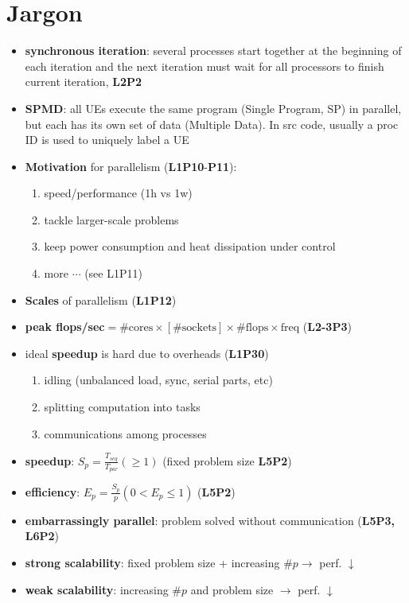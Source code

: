 \section*{Jargon}
\begin{itemize}
\item \textbf{synchronous iteration}: several processes start together at the beginning of each iteration and the next iteration must wait for all processors to finish current iteration, \textbf{L2P2}
\item \textbf{SPMD}: all UEs execute the same program (Single Program, SP) in parallel, but each has its own set of data (Multiple Data). In src code, usually a proc ID is used to uniquely label a UE
\item \textbf{Motivation} for parallelism (\textbf{L1P10}-\textbf{P11}):
  \begin{enumerate}
  \item speed/performance (1h vs 1w)
  \item tackle larger-scale problems
  \item keep power consumption and heat dissipation under control
  \item more $\cdots$ (see L1P11)
  \end{enumerate}
\item \textbf{Scales} of parallelism (\textbf{L1P12})
\item \textbf{peak flops/sec}$ = \# \text{cores} \times [\# \text{sockets}] \times \# \text{flops} \times \text{freq}$ (\textbf{L2-3P3})
\item ideal \textbf{speedup} is hard due to overheads (\textbf{L1P30})
  \begin{enumerate}
  \item idling (unbalanced load, sync, serial parts, etc)
  \item splitting computation into tasks
  \item communications among processes
  \end{enumerate}
\item \textbf{speedup}: $S_p = \frac{T_{seq}}{T_{par}} (\geq 1)$ (fixed problem size \textbf{L5P2})
\item \textbf{efficiency}: $E_p = \frac{S_{p}}{p} (0 < E_p \leq 1)$ (\textbf{L5P2})
\item \textbf{embarrassingly parallel}: problem solved without communication (\textbf{L5P3, L6P2})
\item \textbf{strong scalability}: fixed problem size + increasing $\# p \rightarrow$ perf. $\downarrow$
\item \textbf{weak scalability}: increasing $\# p$ and problem size $\rightarrow$ perf. $\downarrow$

\end{itemize}
